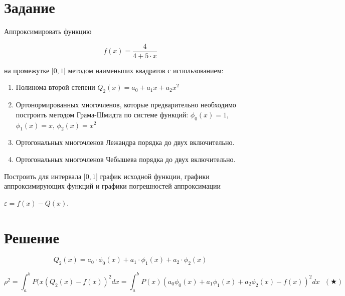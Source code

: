




\section{Задание}

Аппроксимировать функцию 

\begin{displaymath}
f(x) = \frac{4}{4 + 5 \cdot x}
\end{displaymath}

на промежутке $\Big [ 0, 1 \Big ]$ методом наименьших квадратов с использованием:

\begin{enumerate}

\item Полинома второй степени $Q_2(x) = a_0 + a_1x + a_2x^2$

\item Ортонормированных многочленов, которые предварительно необходимо построить методом Грама-Шмидта по системе функций: $\phi_0(x) = 1$, $\phi_1(x) = x$, $\phi_2(x) = x^2$

\item Ортогональных многочленов Лежандра порядка до двух включительно.

\item Ортогональных многочленов Чебышева порядка до двух включительно.

\end{enumerate}

Построить для интервала $\Big [ 0, 1 \Big ]$ график исходной функции, графики аппроксимирующих функций и графики погрешностей аппроксимации 

$\varepsilon = f(x) - Q(x)$.

\section{Решение}

\begin{displaymath}
Q_2(x) = a_0 \cdot \phi_0(x) + a_1 \cdot \phi_1(x) + a_2 \cdot \phi_2(x)
\end{displaymath}

\begin{displaymath}
\rho^2 = \int_a^b P(x (Q_2(x) - f(x))^2 dx = \int_a^b P(x) (a_0 \phi_0(x) + a_1 \phi_1(x) + a_2 \phi_2(x) - f(x))^2 dx \  \  \ (\bigstar)
\end{displaymath}

